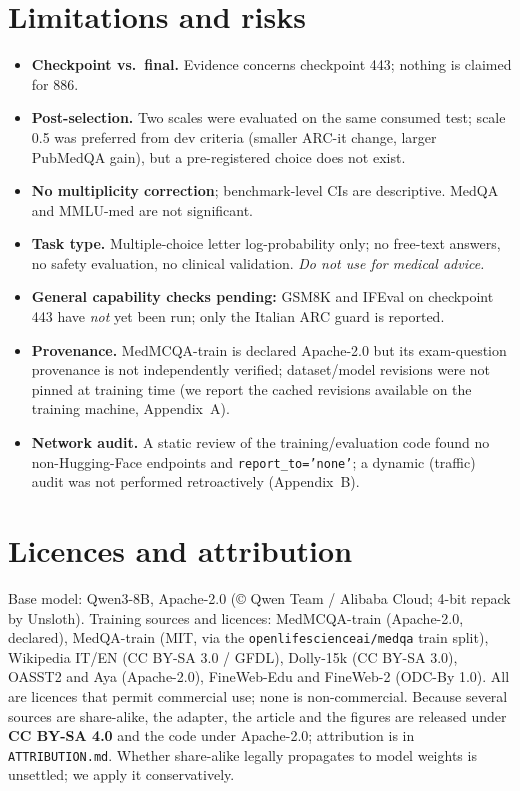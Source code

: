 \documentclass[11pt,a4paper]{article}
\begin{document}
\section{Limitations and risks}
\begin{itemize}
\item \textbf{Checkpoint vs.\ final.} Evidence concerns checkpoint 443; nothing is claimed for 886.
\item \textbf{Post-selection.} Two scales were evaluated on the same consumed test; scale 0.5 was preferred from dev criteria (smaller ARC-it change, larger PubMedQA gain), but a pre-registered choice does not exist.
\item \textbf{No multiplicity correction}; benchmark-level CIs are descriptive. MedQA and MMLU-med are not significant.
\item \textbf{Task type.} Multiple-choice letter log-probability only; no free-text answers, no safety evaluation, no clinical validation. \emph{Do not use for medical advice.}
\item \textbf{General capability checks pending:} GSM8K and IFEval on checkpoint 443 have \emph{not} yet been run; only the Italian ARC guard is reported.
\item \textbf{Provenance.} MedMCQA-train is declared Apache-2.0 but its exam-question provenance is not independently verified; dataset/model revisions were not pinned at training time (we report the cached revisions available on the training machine, Appendix~A).
\item \textbf{Network audit.} A static review of the training/evaluation code found no non-Hugging-Face endpoints and \texttt{report\_to='none'}; a dynamic (traffic) audit was not performed retroactively (Appendix~B).
\end{itemize}

\section{Licences and attribution}
Base model: Qwen3-8B, Apache-2.0 (\copyright{} Qwen Team / Alibaba Cloud; 4-bit repack by Unsloth). Training sources and licences: MedMCQA-train (Apache-2.0, declared), MedQA-train (MIT, via the \texttt{openlifescienceai/medqa} train split), Wikipedia IT/EN (CC BY-SA 3.0 / GFDL), Dolly-15k (CC BY-SA 3.0), OASST2 and Aya (Apache-2.0), FineWeb-Edu and FineWeb-2 (ODC-By 1.0). All are licences that permit commercial use; none is non-commercial. Because several sources are share-alike, the adapter, the article and the figures are released under \textbf{CC BY-SA 4.0} and the code under Apache-2.0; attribution is in \texttt{ATTRIBUTION.md}. Whether share-alike legally propagates to model weights is unsettled; we apply it conservatively.
\end{document}
